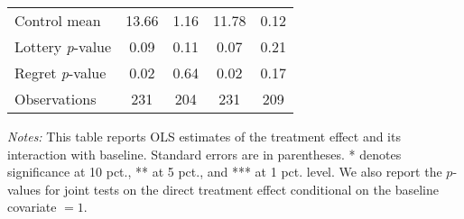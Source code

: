 \begin{table}[htbp]
{\begin{threeparttable}
\begin{tabular}{l*{4}{c}}
Control mean    &    13.66         &     1.16         &    11.78         &     0.12         \\
Lottery \emph{p}-value&     0.09         &     0.11         &     0.07         &     0.21         \\
Regret \emph{p}-value&     0.02         &     0.64         &     0.02         &     0.17         \\
Observations    &      231         &      204         &      231         &      209         \\
\bottomrule \end{tabular} \begin{tablenotes}[flushleft] \footnotesize \item \emph{Notes:} This table reports OLS estimates of the treatment effect and its interaction with baseline. Standard errors are in parentheses. * denotes significance at 10 pct., ** at 5 pct., and *** at 1 pct. level. We also report the \(p\)-values for joint tests on the direct treatment effect conditional on the baseline covariate $= 1$. \end{tablenotes} \end{threeparttable} } \end{table}

